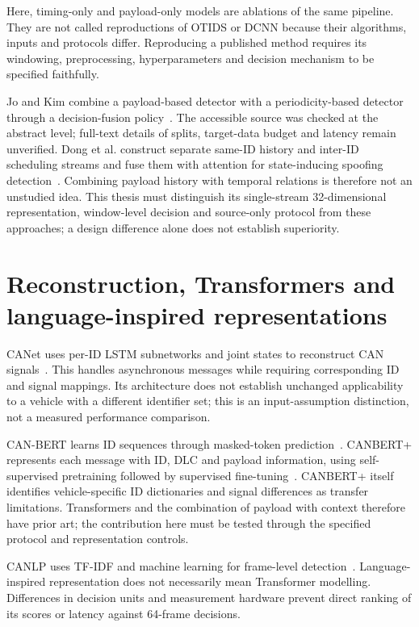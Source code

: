 \documentclass[12pt,a4paper,oneside,openany]{extbook}
\begin{document}
Here, timing-only and payload-only models are ablations of the same pipeline. They are not called reproductions of OTIDS or DCNN because their algorithms, inputs and protocols differ. Reproducing a published method requires its windowing, preprocessing, hyperparameters and decision mechanism to be specified faithfully.

Jo and Kim combine a payload-based detector with a periodicity-based detector through a decision-fusion policy~\cite{jo2026fusion}. The accessible source was checked at the abstract level; full-text details of splits, target-data budget and latency remain unverified. Dong et al. construct separate same-ID history and inter-ID scheduling streams and fuse them with attention for state-inducing spoofing detection~\cite{dong2026mtff}. Combining payload history with temporal relations is therefore not an unstudied idea. This thesis must distinguish its single-stream 32-dimensional representation, window-level decision and source-only protocol from these approaches; a design difference alone does not establish superiority.

\section{Reconstruction, Transformers and language-inspired representations}
CANet uses per-ID LSTM subnetworks and joint states to reconstruct CAN signals~\cite{hanselmann2020canet}. This handles asynchronous messages while requiring corresponding ID and signal mappings. Its architecture does not establish unchanged applicability to a vehicle with a different identifier set; this is an input-assumption distinction, not a measured performance comparison.

CAN-BERT learns ID sequences through masked-token prediction~\cite{alkhatib2022canbert}. CANBERT+ represents each message with ID, DLC and payload information, using self-supervised pretraining followed by supervised fine-tuning~\cite{won2026canbertplus}. CANBERT+ itself identifies vehicle-specific ID dictionaries and signal differences as transfer limitations. Transformers and the combination of payload with context therefore have prior art; the contribution here must be tested through the specified protocol and representation controls.

CANLP uses TF-IDF and machine learning for frame-level detection~\cite{balasubramanian2025canlp}. Language-inspired representation does not necessarily mean Transformer modelling. Differences in decision units and measurement hardware prevent direct ranking of its scores or latency against 64-frame decisions.
\end{document}

